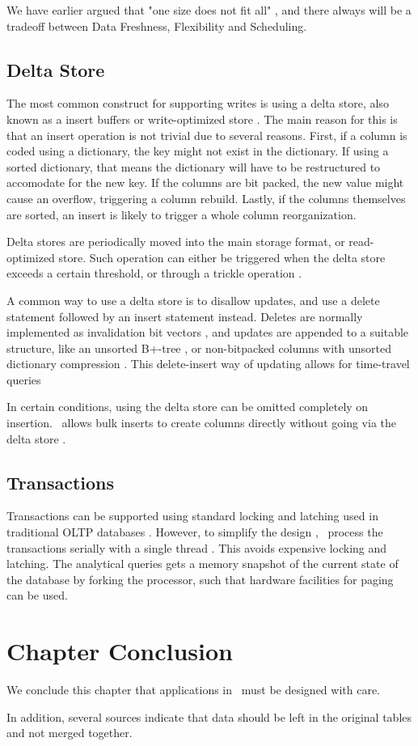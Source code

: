 We have earlier argued that "one size does not fit all" \cite{Psaroudakis2014-ma}, and there always will be a tradeoff between Data Freshness, Flexibility and Scheduling.


\subsection{Delta Store}
\label{sub:Delta Store}
The most common construct for supporting writes is using a delta store, also known as a insert buffers or write-optimized store \cite{Raman2013-em, Stonebraker2005-qz}. The main reason for this is that an insert operation is not trivial due to several reasons. First, if a column is coded using a dictionary, the key might not exist in the dictionary. If using a sorted dictionary, that means the dictionary will have to be restructured to accomodate for the new key. If the columns are bit packed, the new value might cause an overflow, triggering a column rebuild. Lastly, if the columns themselves are sorted, an insert is likely to trigger a whole column reorganization.

Delta stores are periodically moved into the main storage format, or read-optimized store. Such operation can either be triggered when the delta store exceeds a certain threshold, or through a trickle operation \cite{Lahiri2015-mz, Farber2012-vh}.

A common way to use a delta store is to disallow updates, and use a delete statement followed by an insert statement instead. Deletes are normally implemented as invalidation bit vectors \cite{Raman2013-em, Lamb2012-kg}, and updates are appended to a suitable structure, like an unsorted B+-tree \cite{Psaroudakis2014-ma}, or non-bitpacked columns with unsorted dictionary compression \cite{Farber2012-vh}. This delete-insert way of updating allows for time-travel queries \cite{Scwalb2014-hn, Plattner2014-fr}

In certain conditions, using the delta store can be omitted completely on insertion. \mssql~allows bulk inserts to create columns directly without going via the delta store \cite{Larson2013-mc}.

\subsection{Transactions}
\label{sub:Transactions}
Transactions can be supported using standard locking and latching used in traditional OLTP databases \cite{Lamb2012-kg}. However, to simplify the design , \hyper~process the transactions serially with a single thread \cite{Psaroudakis2014-ma}. This avoids expensive locking and latching. The analytical queries gets a memory snapshot of the current state of the database by forking the processor, such that hardware facilities for paging can be used.

\section{Chapter Conclusion}
\label{sec:Chapter Conclusion}
We conclude this chapter that applications in \bd~must be designed with care.

In addition, several sources indicate that data should be left in the original tables and not merged together.
